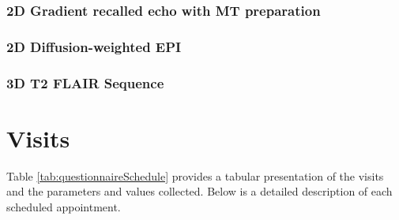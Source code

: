 \subsubsection{2D Gradient recalled echo with MT preparation}

\subsubsection{2D Diffusion-weighted EPI}

\subsubsection{3D T2 \ac{FLAIR} Sequence}

\section{Visits}
Table \ref{tab:questionnaireSchedule} provides a tabular presentation of the visits and the parameters and values collected. Below is a detailed description of each scheduled appointment.



